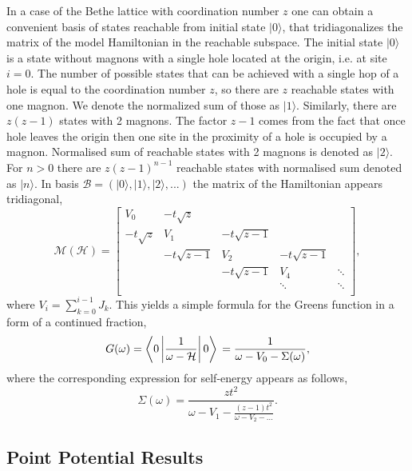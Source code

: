\documentclass[%
 reprint,
 amsmath,amssymb,
 aps,
prb,
floatfix,
]{revtex4-1}
\newcommand{\ket}[1]{\lvert#1\rangle}
\begin{document}
In a case of the Bethe lattice with coordination number $z$ one can obtain a convenient basis of states reachable from initial state $\ket{0}$, that tridiagonalizes the matrix of the model Hamiltonian in the reachable subspace. The initial state $\ket{0}$ is a state without magnons with a single hole located at the origin, i.e. at site $i = 0$. The number of possible states that can be achieved with a single hop of a hole is equal to the coordination number $z$, so there are $z$ reachable states with one magnon. We denote the normalized sum of those as $\ket{1}$. Similarly, there are $z(z-1)$ states with 2 magnons. The factor $z-1$ comes from the fact that once hole leaves the origin then one site in the proximity of a hole is occupied by a magnon. Normalised sum of reachable states with 2 magnons is denoted as $\ket{2}$. For $n > 0$ there are $z(z-1)^{n-1}$ reachable states with normalised sum denoted as $\ket{n}$. In basis $\mathcal{B} = (\ket{0}, \ket{1}, \ket{2}, ...)$ the matrix of the Hamiltonian appears tridiagonal,
\begin{equation}
\mathcal{M}(\mathcal{H})=\begin{bmatrix}
V_0 & -t\sqrt{z} &  &  &  \\
-t\sqrt{z} & V_1 & -t\sqrt{z-1} &  &  \\
 & -t\sqrt{z-1} & V_2 & -t\sqrt{z-1}&  \\
 &  &  -t\sqrt{z-1} & V_4 & \ddots \\
 &  &  & \ddots & \ddots \\
\end{bmatrix},
\end{equation}
where $V_i = \sum_{k=0}^{i-1} J_k$. This yields a simple formula for the Greens function in a form of a continued fraction,
\begin{equation}
G(\omega) = \left\langle 0 \left| \frac{1}{\omega - \mathcal{H}} \right| 0 \right\rangle \\
= \frac{1}{\omega - V_0 - \Sigma(\omega)},
\end{equation} 
where the corresponding expression for self-energy appears as follows,
\begin{equation}
\Sigma(\omega) = \frac{zt^2}{\omega - V_1 - \frac{(z-1)t^2}{\omega - V_2 - \hdots}}.
\end{equation}

\subsection{Point Potential Results}
\end{document}
